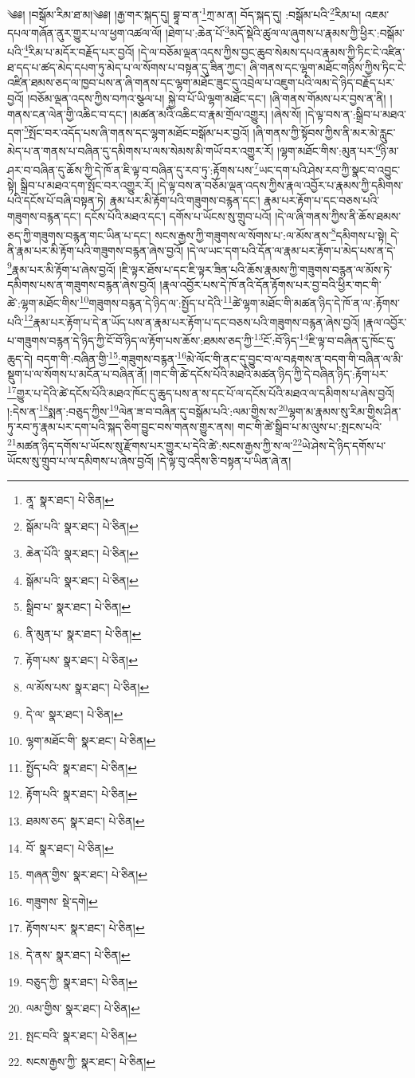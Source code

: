 \setcounter{footnote}{0} 
༄༅། །བསྒོམ་རིམ་ཐ་མ།༄༅། །རྒྱ་གར་སྐད་དུ། བྷཱ་བ་ན་\footnote{ནཱ་  སྣར་ཐང་།  པེ་ཅིན། }ཀྲ་མ་ན། བོད་སྐད་དུ། :བསྒོམ་པའི་\footnote{སྒོམ་པའི་  སྣར་ཐང་།  པེ་ཅིན། }རིམ་པ། འཇམ་དཔལ་གཞོན་ནུར་གྱུར་པ་ལ་ཕྱག་འཚལ་ལོ། །ཐེག་པ་:ཆེན་པོ་\footnote{ཆེན་པོའི་  སྣར་ཐང་།  པེ་ཅིན། }མདོ་སྡེའི་ཚུལ་ལ་ཞུགས་པ་རྣམས་ཀྱི་ཕྱིར་:བསྒོམ་པའི་\footnote{སྒོམ་པའི་  སྣར་ཐང་།  པེ་ཅིན། }རིམ་པ་མདོར་བརྗོད་པར་བྱའོ། །དེ་ལ་བཅོམ་ལྡན་འདས་ཀྱིས་བྱང་ཆུབ་སེམས་དཔའ་རྣམས་ཀྱི་ཏིང་ངེ་འཛིན་ཐ་དད་པ་ཚད་མེད་དཔག་ཏུ་མེད་པ་ལ་སོགས་པ་བསྟན་དུ་ཟིན་ཀྱང་། ཞི་གནས་དང་ལྷག་མཐོང་གཉིས་ཀྱིས་ཏིང་ངེ་འཛིན་ཐམས་ཅད་ལ་ཁྱབ་པས་ན་ཞི་གནས་དང་ལྷག་མཐོང་ཟུང་དུ་འབྲེལ་པ་འཇུག་པའི་ལམ་དེ་ཉིད་བརྗོད་པར་བྱའོ། །བཅོམ་ལྡན་འདས་ཀྱིས་བཀའ་སྩལ་པ། སྐྱེ་བ་པོ་ཡི་ལྷག་མཐོང་དང་། །ཞི་གནས་གོམས་པར་བྱས་ན་ནི། །གནས་ངན་ལེན་གྱི་འཆིང་བ་དང་། །མཚན་མའི་འཆིང་བ་རྣམ་གྲོལ་འགྱུར། །ཞེས་སོ། །དེ་ལྟ་བས་ན་:སྒྲིབ་པ་མཐའ་དག་\footnote{སྒྲིབ་པ་  སྣར་ཐང་།  པེ་ཅིན། }སྤོང་བར་འདོད་པས་ཞི་གནས་དང་ལྷག་མཐོང་བསྒོམ་པར་བྱའོ། །ཞི་གནས་ཀྱི་སྟོབས་ཀྱིས་ནི་མར་མེ་རླུང་མེད་པ་ན་གནས་པ་བཞིན་དུ་དམིགས་པ་ལས་སེམས་མི་གཡོ་བར་འགྱུར་རོ། །ལྷག་མཐོང་གིས་:མུན་པར་\footnote{ནི་མུན་པ་  སྣར་ཐང་།  པེ་ཅིན། }ཉི་མ་ཤར་བ་བཞིན་དུ་ཆོས་ཀྱི་དེ་ཁོ་ན་ཇི་ལྟ་བ་བཞིན་དུ་རབ་ཏུ་:རྟོགས་པས་\footnote{རྟོག་པས་  སྣར་ཐང་།  པེ་ཅིན། }ཡང་དག་པའི་ཤེས་རབ་ཀྱི་སྣང་བ་འབྱུང་སྟེ། སྒྲིབ་པ་མཐའ་དག་སྤོང་བར་འགྱུར་རོ། །དེ་ལྟ་བས་ན་བཅོམ་ལྡན་འདས་ཀྱིས་རྣལ་འབྱོར་པ་རྣམས་ཀྱི་དམིགས་པའི་དངོས་པོ་བཞི་བསྟན་ཏེ། རྣམ་པར་མི་རྟོག་པའི་གཟུགས་བརྙན་དང་། རྣམ་པར་རྟོག་པ་དང་བཅས་པའི་གཟུགས་བརྙན་དང་། དངོས་པོའི་མཐའ་དང་། དགོས་པ་ཡོངས་སུ་གྲུབ་པའོ། །དེ་ལ་ཞི་གནས་ཀྱིས་ནི་ཆོས་ཐམས་ཅད་ཀྱི་གཟུགས་བརྙན་གང་ཡིན་པ་དང་། སངས་རྒྱས་ཀྱི་གཟུགས་ལ་སོགས་པ་:ལ་མོས་ནས་\footnote{ལ་མོས་པས་  སྣར་ཐང་།  པེ་ཅིན། }དམིགས་པ་སྟེ། དེ་ནི་རྣམ་པར་མི་རྟོག་པའི་གཟུགས་བརྙན་ཞེས་བྱའོ། །དེ་ལ་ཡང་དག་པའི་དོན་ལ་རྣམ་པར་རྟོག་པ་མེད་པས་ན་དེ་\footnote{དེ་ལ་  སྣར་ཐང་།  པེ་ཅིན། }རྣམ་པར་མི་རྟོག་པ་ཞེས་བྱའོ། །ཇི་ལྟར་ཐོས་པ་དང་ཇི་ལྟར་ཟིན་པའི་ཆོས་རྣམས་ཀྱི་གཟུགས་བརྙན་ལ་མོས་ཏེ་དམིགས་པས་ན་གཟུགས་བརྙན་ཞེས་བྱའོ། །རྣལ་འབྱོར་པས་དེ་ཁོ་ནའི་དོན་རྟོགས་པར་བྱ་བའི་ཕྱིར་གང་གི་ཚེ་:ལྷག་མཐོང་གིས་\footnote{ལྷག་མཐོང་གི་  སྣར་ཐང་།  པེ་ཅིན། }གཟུགས་བརྙན་དེ་ཉིད་ལ་:སྤྱོད་པ་དེའི་\footnote{སྤྱོད་པའི་  སྣར་ཐང་།  པེ་ཅིན། }ཚེ་ལྷག་མཐོང་གི་མཚན་ཉིད་དེ་ཁོ་ན་ལ་:རྟོགས་པའི་\footnote{རྟོག་པའི་  སྣར་ཐང་།  པེ་ཅིན། }རྣམ་པར་རྟོག་པ་དེ་ན་ཡོད་པས་ན་རྣམ་པར་རྟོག་པ་དང་བཅས་པའི་གཟུགས་བརྙན་ཞེས་བྱའོ། །རྣལ་འབྱོར་པ་གཟུགས་བརྙན་དེ་ཉིད་ཀྱི་ངོ་བོ་ཉིད་ལ་རྟོག་པས་ཆོས་:ཐམས་ཅད་ཀྱི་\footnote{ཐམས་ཅད་  སྣར་ཐང་།  པེ་ཅིན། }ངོ་:བོ་ཉིད་\footnote{བོ་  སྣར་ཐང་།  པེ་ཅིན། }ཇི་ལྟ་བ་བཞིན་དུ་ཁོང་དུ་ཆུད་དེ། བདག་གི་:བཞིན་གྱི་\footnote{གཞན་གྱིས་  སྣར་ཐང་།  པེ་ཅིན། }:གཟུགས་བརྙན་\footnote{གཟུགས་  སྡེ་དགེ། }མེ་ལོང་གི་ནང་དུ་བྱུང་བ་ལ་བརྟགས་ན་བདག་གི་བཞིན་ལ་མི་སྡུག་པ་ལ་སོགས་པ་མངོན་པ་བཞིན་ནོ། །གང་གི་ཚེ་དངོས་པོའི་མཐའི་མཚན་ཉིད་ཀྱི་དེ་བཞིན་ཉིད་:རྟོག་པར་\footnote{རྟོགས་པར་  སྣར་ཐང་།  པེ་ཅིན། }གྱུར་པ་དེའི་ཚེ་དངོས་པོའི་མཐའ་ཁོང་དུ་ཆུད་པས་ན་ས་དང་པོ་ལ་དངོས་པོའི་མཐའ་ལ་དམིགས་པ་ཞེས་བྱའོ། །:དེས་ན་\footnote{དེ་ནས་  སྣར་ཐང་།  པེ་ཅིན། }སྨན་:བཅུད་ཀྱིས་\footnote{བཅུད་ཀྱི་  སྣར་ཐང་།  པེ་ཅིན། }ལེན་ཟ་བ་བཞིན་དུ་བསྒོམ་པའི་:ལམ་གྱིས་ས་\footnote{ལམ་གྱིས་  སྣར་ཐང་།  པེ་ཅིན། }ལྷག་མ་རྣམས་སུ་རིམ་གྱིས་ཤིན་ཏུ་རབ་ཏུ་རྣམ་པར་དག་པའི་སྐད་ཅིག་བྱུང་བས་གནས་གྱུར་ནས། གང་གི་ཚེ་སྒྲིབ་པ་མ་ལུས་པ་:སྤངས་པའི་\footnote{སྤང་བའི་  སྣར་ཐང་།  པེ་ཅིན། }མཚན་ཉིད་དགོས་པ་ཡོངས་སུ་རྫོགས་པར་གྱུར་པ་དེའི་ཚེ་:སངས་རྒྱས་ཀྱི་ས་ལ་\footnote{སངས་རྒྱས་ཀྱི་  སྣར་ཐང་།  པེ་ཅིན། }ཡེ་ཤེས་དེ་ཉིད་དགོས་པ་ཡོངས་སུ་གྲུབ་པ་ལ་དམིགས་པ་ཞེས་བྱའོ། །དེ་ལྟ་བུ་འདིས་ཅི་བསྟན་པ་ཡིན་ཞེ་ན། 